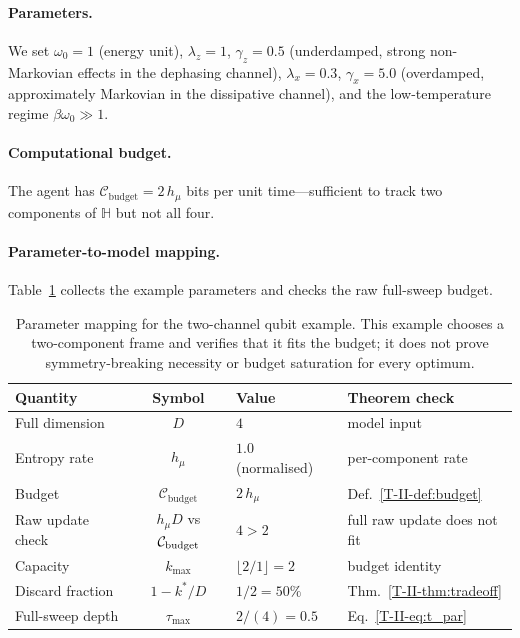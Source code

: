 \documentclass[12pt,a4paper,openany]{book}
\begin{document}
\paragraph{Parameters.}
We set $\omega_0 = 1$ (energy unit),
$\lambda_z = 1$, $\gamma_z = 0.5$ (underdamped, strong
non-Markovian effects in the dephasing channel),
$\lambda_x = 0.3$, $\gamma_x = 5.0$ (overdamped,
approximately Markovian in the dissipative channel),
and the low-temperature regime $\beta\omega_0 \gg 1$.

\paragraph{Computational budget.}
The agent has
$\mathcal{C}_{\mathrm{budget}} = 2\,h_\mu$
bits per unit time---sufficient to track two components
of $\mathbb{H}$ but not all four.

\paragraph{Parameter-to-model mapping.}
Table~\ref{T-II-tab:params} collects the example parameters and
checks the raw full-sweep budget.

\begin{table}[t]
\centering
\small
\begin{tabular}{@{}lcll@{}}
\toprule
\textbf{Quantity} & \textbf{Symbol} & \textbf{Value}
  & \textbf{Theorem check} \\
\midrule
Full dimension & $D$ & $4$ &
  model input \\
Entropy rate & $h_\mu$ & $1.0$ (normalised) &
  per-component rate \\
Budget & $\mathcal{C}_{\mathrm{budget}}$ & $2\,h_\mu$
  & Def.~\ref{T-II-def:budget} \\
\midrule
Raw update check & $h_\mu D$ vs $\mathcal{C}_{\rm budget}$
  & $4 > 2$ & full raw update does not fit \\
Capacity & $k_{\max}$ & $\lfloor 2/1 \rfloor = 2$
  & budget identity \\
Discard fraction & $1 - k^*/D$ & $1/2 = 50\%$
  & Thm.~\ref{T-II-thm:tradeoff} \\
Full-sweep depth & $\tau_{\max}$ & $2/(4) = 0.5$
  & Eq.~\eqref{T-II-eq:t_par} \\
\bottomrule
\end{tabular}
\caption{Parameter mapping for the two-channel qubit
example.  This example chooses a two-component frame and verifies that
it fits the budget; it does not prove symmetry-breaking necessity or
budget saturation for every optimum.}
\label{T-II-tab:params}
\end{table}
\end{document}
